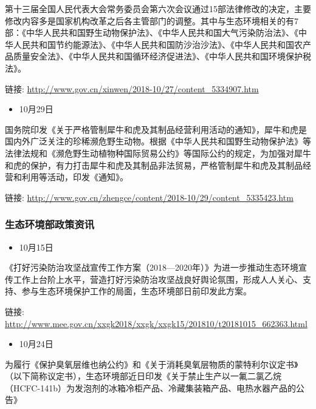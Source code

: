 \documentclass[
]{book}
\providecommand{\tightlist}{%
  \setlength{\itemsep}{0pt}\setlength{\parskip}{0pt}}
\begin{document}
第十三届全国人民代表大会常务委员会第六次会议通过15部法律修改的决定，主要修改内容多是国家机构改革之后各主管部门的调整。其中与生态环境相关的有7部：《中华人民共和国野生动物保护法》、《中华人民共和国大气污染防治法》、《中华人民共和国节约能源法》、《中华人民共和国防沙治沙法》、《中华人民共和国农产品质量安全法》、《中华人民共和国循环经济促进法》、《中华人民共和国环境保护税法》。

链接: \url{http://www.gov.cn/xinwen/2018-10/27/content_5334907.htm}

\begin{itemize}
\tightlist
\item
  10月29日
\end{itemize}

国务院印发《关于严格管制犀牛和虎及其制品经营利用活动的通知》，犀牛和虎是国内外广泛关注的珍稀濒危野生动物。根据《中华人民共和国野生动物保护法》等法律法规和《濒危野生动植物种国际贸易公约》等国际公约的规定，为加强对犀牛和虎的保护，有力打击犀牛和虎及其制品非法贸易，严格管制犀牛和虎及其制品经营和利用等活动，印发《通知》。

链接: \url{http://www.gov.cn/zhengce/content/2018-10/29/content_5335423.htm}

\hypertarget{ux751fux6001ux73afux5883ux90e8ux653fux7b56ux8d44ux8baf-6}{%
\subsubsection*{生态环境部政策资讯}\label{ux751fux6001ux73afux5883ux90e8ux653fux7b56ux8d44ux8baf-6}}

\begin{itemize}
\tightlist
\item
  10月15日
\end{itemize}

《打好污染防治攻坚战宣传工作方案（2018---2020年）》为进一步推动生态环境宣传工作上台阶上水平，营造打好污染防治攻坚战良好舆论氛围，形成人人关心、支持、参与生态环境保护工作的局面，生态环境部日前印发此方案。

链接: \url{http://www.mee.gov.cn/xxgk2018/xxgk/xxgk15/201810/t20181015_662363.html}

\begin{itemize}
\tightlist
\item
  10月24日
\end{itemize}

为履行《保护臭氧层维也纳公约》和《关于消耗臭氧层物质的蒙特利尔议定书》（以下简称议定书），生态环境部近日印发《关于禁止生产以一氟二氯乙烷（HCFC-141b）为发泡剂的冰箱冷柜产品、冷藏集装箱产品、电热水器产品的公告》
\end{document}
